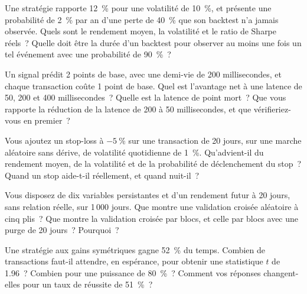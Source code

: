 \begin{question}\label{iq:iv2:research-and-strategy-cases:31}
Une stratégie rapporte 12~\% pour une volatilité de 10~\%, et présente une probabilité de 2~\% par an d'une perte de 40~\% que son backtest n'a jamais observée. Quels sont le rendement moyen, la volatilité et le ratio de Sharpe réels~? Quelle doit être la durée d'un backtest pour observer au moins une fois un tel événement avec une probabilité de 90~\%~?
\end{question}

\begin{question}\label{iq:iv2:research-and-strategy-cases:32}
Un signal prédit 2 points de base, avec une demi-vie de 200 millisecondes, et chaque transaction coûte 1 point de base. Quel est l'avantage net à une latence de 50, 200 et 400 millisecondes~? Quelle est la latence de point mort~? Que vous rapporte la réduction de la latence de 200 à 50 millisecondes, et que vérifieriez-vous en premier~?
\end{question}

\begin{question}\label{iq:iv2:research-and-strategy-cases:33}
Vous ajoutez un stop-loss à $-5~\%$ sur une transaction de 20 jours, sur une marche aléatoire sans dérive, de volatilité quotidienne de 1~\%. Qu'advient-il du rendement moyen, de la volatilité et de la probabilité de déclenchement du stop~? Quand un stop aide-t-il réellement, et quand nuit-il~?
\end{question}

\begin{question}\label{iq:iv2:research-and-strategy-cases:34}
Vous disposez de dix variables persistantes et d'un rendement futur à 20 jours, sans relation réelle, sur 1\,000 jours. Que montre une validation croisée aléatoire à cinq plis~? Que montre la validation croisée par blocs, et celle par blocs avec une purge de 20 jours~? Pourquoi~?
\end{question}

\begin{question}\label{iq:iv2:research-and-strategy-cases:35}
Une stratégie aux gains symétriques gagne 52~\% du temps. Combien de transactions faut-il attendre, en espérance, pour obtenir une statistique $t$ de 1.96~? Combien pour une puissance de 80~\%~? Comment vos réponses changent-elles pour un taux de réussite de 51~\%~?
\end{question}

